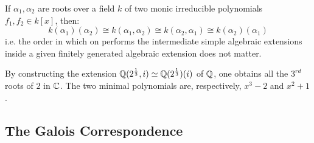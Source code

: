         \begin{remark}
            If $\alpha_1, \alpha_2$ are roots over a field $k$ of two monic irreducible polynomials $f_1, f_2 \in k[x]$, then:
                $$k(\alpha_1)(\alpha_2) \cong k(\alpha_1, \alpha_2) \cong k(\alpha_2, \alpha_1) \cong k(\alpha_2)(\alpha_1)$$
            i.e. the order in which on performs the intermediate simple algebraic extensions inside a given finitely generated algebraic extension does not matter.
        \end{remark}
        \begin{example}
            By constructing the extension $\mathbb{Q}(2^{\frac13}, i) \simeq \mathbb{Q}(2^{\frac13})(i)$ of $\mathbb{Q}$, one obtains all the $3^{rd}$ roots of $2$ in $\mathbb{C}$. The two minimal polynomials are, respectively, $x^3 - 2$ and $x^2 + 1$. 
        \end{example}




    \subsection{The Galois Correspondence}